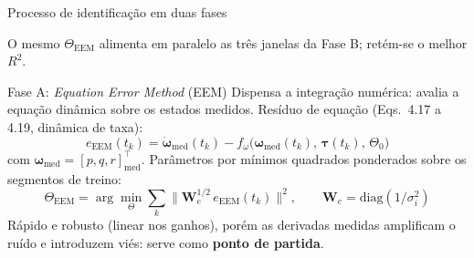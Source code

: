 \documentclass[aspectratio=169,11pt]{beamer}
\begin{document}
\begin{frame}{Processo de identificação em duas fases}
{%
  }

  {\footnotesize O mesmo $\Theta_{\text{EEM}}$ alimenta em paralelo as três janelas da Fase B; retém-se o melhor $R^2$.}
\end{frame}

\begin{frame}{Fase A: \textit{Equation Error Method} (EEM)}
  Dispensa a integração numérica: avalia a equação dinâmica sobre os estados medidos. Resíduo de equação (Eqs.~4.17 a 4.19, dinâmica de taxa):
  \begin{equation*}
    e_{\text{EEM}}(t_k) = \dot{\boldsymbol{\omega}}_{\text{med}}(t_k) - f_\omega\big(\boldsymbol{\omega}_{\text{med}}(t_k),\,\boldsymbol{\tau}(t_k),\,\Theta_0\big) \tag{4.9}
  \end{equation*}
  com $\boldsymbol{\omega}_{\text{med}} = [p,q,r]^\top_{\text{med}}$. Parâmetros por mínimos quadrados ponderados sobre os segmentos de treino:
  \begin{equation*}
    \Theta_{\text{EEM}} = \arg\min_{\Theta} \sum_{k} \big\| \mathbf{W}_e^{1/2}\, e_{\text{EEM}}(t_k) \big\|^2, \qquad \mathbf{W}_e = \mathrm{diag}(1/\sigma_i^2) \tag{4.10}
  \end{equation*}
  Rápido e robusto (linear nos ganhos), porém as derivadas medidas amplificam o ruído e introduzem viés: serve como \textbf{ponto de partida}.
\end{frame}
\end{document}
